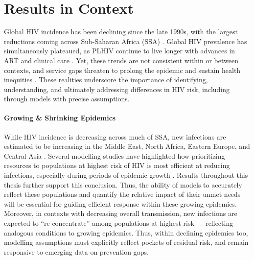 \section{Results in Context}\label{conc.context}
Global HIV incidence has been declining since the late 1990s,
with the largest reductions coming across Sub-Saharan Africa (SSA) \cite{Joshi2021,AIDSinfo}.
Global HIV prevalence has simultaneously plateaued,
as PLHIV continue to live longer with advances in ART and clinical care \cite{AIDSinfo}.
Yet, these trends are not consistent within or between contexts,
and service gaps threaten to prolong the epidemic and sustain health inequities
\cite{Akullian2017,Tanser2018,Ortblad2019,Barr2021,Joshi2021,AIDSinfo}.
These realities underscore the importance of
identifying, understanding, and ultimately addressing differences in HIV risk,
including through models with precise assumptions.
\paragraph{Growing \& Shrinking Epidemics}
While HIV incidence is decreasing across much of SSA, new infections are estimated to be
increasing in the Middle East, North Africa, Eastern Europe, and Central Asia \cite{AIDSinfo}.
Several modelling studies have highlighted how
prioritizing resources to populations at highest risk of HIV
is most efficient at reducing infections,
especially during periods of epidemic growth \cite{Boily2002,Silhol2021,Stone2021}.
Results throughout this thesis further support this conclusion.
Thus, the ability of models to accurately reflect these populations
and quantify the relative impact of their unmet needs
will be essential for guiding efficient response within these growing epidemics.
Moreover, in contexts with decreasing overall transmission,
new infections are expected to ``re-concentrate'' among populations at highest risk
\cite{Akullian2017,Ortblad2019,Barr2021,Joshi2021}
--- reflecting analogous conditions to growing epidemics.
Thus, within declining epidemics too,
modelling assumptions must explicitly reflect pockets of residual risk,
and remain responsive to emerging data on prevention gaps.

